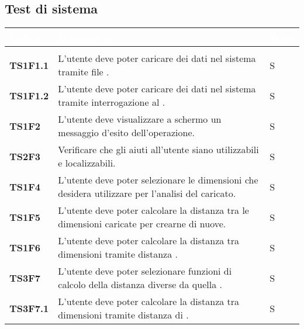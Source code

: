 \subsection{Test di sistema}

{
\renewcommand{\arraystretch}{1.5}
\renewcommand\extrarowheight{1.5pt}
\setlength\arrayrulewidth{1pt}
\begin{longtable}{ C{2cm} | C{12cm}| C{1.5cm} } 
		\textcolor{white}{\textbf{Codice}} & 
		\textcolor{white}{\textbf{Descrizione}} & 
		\textcolor{white}{\textbf{Stato}} \\
		\endfirsthead
		\\
	    \endfoot
	    \endlastfoot

\textbf{TS1F1.1} & 
L'utente deve poter caricare dei dati nel sistema tramite file . & 
S\\

\textbf{TS1F1.2} & 
L'utente deve poter caricare dei dati nel sistema tramite interrogazione al . & 
S\\

\textbf{TS1F2} & 
L'utente deve visualizzare a schermo un messaggio d'esito dell'operazione. & 
S\\
		
\textbf{TS2F3} & 
Verificare che gli aiuti all'utente siano utilizzabili e localizzabili. & 
S\\		

\textbf{TS1F4} & 
L'utente deve poter selezionare le dimensioni che desidera utilizzare per l'analisi del  caricato. & 
S\\	

\textbf{TS1F5} & 
L'utente deve poter calcolare la distanza tra le dimensioni caricate per crearne di nuove. & 
S\\	

\textbf{TS1F6} & 
L'utente deve poter calcolare la distanza tra dimensioni tramite distanza  \textit{}. & 
S\\

\textbf{TS3F7} & 
L'utente deve poter selezionare funzioni di calcolo della distanza diverse da quella . & 
S\\	

\textbf{TS3F7.1} & 
L'utente deve poter calcolare la distanza tra dimensioni tramite distanza di . & 
S\\


\end{longtable}}
